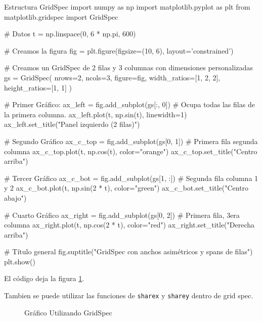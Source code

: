 \begin{pycode}{Estructura GridSpec}
import numpy as np
import matplotlib.pyplot as plt
from matplotlib.gridspec import GridSpec

# Datos
t = np.linspace(0, 6 * np.pi, 600)

# Creamos la figura
fig = plt.figure(figsize=(10, 6), layout='constrained')

# Creamos un GridSpec de 2 filas y 3 columnas con dimensiones personalizadas
gs = GridSpec(
    nrows=2,
    ncols=3,
    figure=fig,
    width_ratios=[1, 2, 2],
    height_ratios=[1, 1]
)

# Primer Gráfico:
ax_left = fig.add_subplot(gs[:, 0]) # Ocupa todas las filas de la primera columna.
ax_left.plot(t, np.sin(t), linewidth=1)
ax_left.set_title("Panel izquierdo (2 filas)")

# Segundo Gráfico
ax_c_top = fig.add_subplot(gs[0, 1]) # Primera fila segunda columna
ax_c_top.plot(t, np.cos(t), color="orange")
ax_c_top.set_title("Centro arriba")

# Tercer Gráfico
ax_c_bot = fig.add_subplot(gs[1, :]) # Segunda fila columna 1 y 2
ax_c_bot.plot(t, np.sin(2 * t), color="green")
ax_c_bot.set_title("Centro abajo")

# Cuarto Gráfico
ax_right = fig.add_subplot(gs[0, 2]) # Primera fila, 3era columna
ax_right.plot(t, np.cos(2 * t), color="red")
ax_right.set_title("Derecha arriba")

# Título general
fig.suptitle("GridSpec con anchos asimétricos y spans de filas")
plt.show()
\end{pycode}

El código deja la figura \ref{fig:grafico_con_GridSpec}.

\begin{nota}
    Tambien se puede utilizar las funciones de \texttt{sharex} y \texttt{sharey} dentro de grid spec.
\end{nota}

\begin{figure}[ht]
    \centering
     
    \caption{Gráfico Utilizando GridSpec}
    \label{fig:grafico_con_GridSpec}
\end{figure}